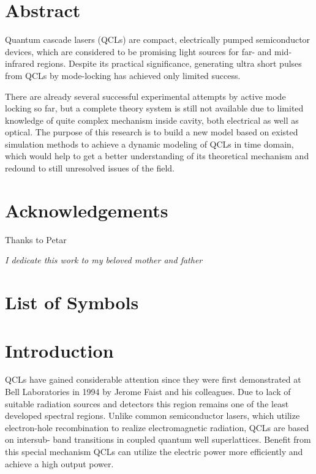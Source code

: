 \documentclass[11pt,final]{scrbook}
\begin{document}







\chapter*{Abstract}
Quantum cascade lasers (QCLs) are compact, electrically pumped semiconductor devices, which are considered to be promising light sources for far- and mid-infrared regions. Despite its practical significance, generating ultra short pulses from QCLs by mode-locking has achieved only limited success. 

There are already several successful experimental attempts by active mode locking so far, but a complete theory system is still not available due to limited knowledge of quite complex mechanism inside cavity, both electrical as well as optical. The purpose of this research is to build a new model based on existed simulation methods to achieve a dynamic modeling of QCLs in time domain, which would help to get a better understanding of its theoretical mechanism and redound to still unresolved issues of the field.

\chapter*{Acknowledgements} 

Thanks to Petar

\clearpage
\thispagestyle{empty}

\vspace*{2cm}
\begin{center}
{\normalfont\itshape  I dedicate this work to my beloved mother and father}
\end{center}

\chapter*{List of Symbols}



\tableofcontents

\chapter{Introduction}
QCLs have gained considerable attention since they were first demonstrated at Bell Laboratories in 1994 by Jerome Faist and his colleagues\cite{faist1994quantum}. Due to lack of suitable radiation sources and detectors this region remains one of the least developed spectral regions. Unlike common semiconductor lasers, which utilize electron-hole recombination to realize electromagnetic radiation, QCLs are based on intersub- band transitions in coupled quantum well superlattices\cite{williams2007terahertz}. Benefit from this special mechanism QCLs can utilize the electric power more efficiently and achieve a high output power.
\end{document}
